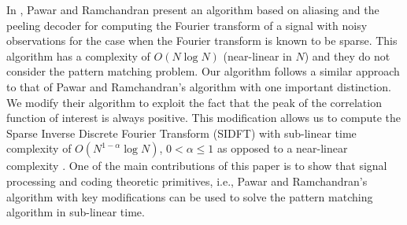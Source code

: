 In \cite{pawar2014robust}, Pawar and Ramchandran present an algorithm based on aliasing and the peeling decoder for computing the Fourier transform of a signal with noisy observations for the case when the Fourier transform is known to be sparse. This algorithm has a complexity of $O(N \log N)$ (near-linear in $N$) and they do not consider the pattern matching problem. Our algorithm follows a similar approach to that of Pawar and Ramchandran's algorithm with one important distinction. We modify their algorithm to exploit the fact that the peak of the correlation function of interest is always positive. This modification allows us to compute the Sparse Inverse Discrete Fourier Transform (SIDFT) with sub-linear time complexity of $O(N^{1-\alpha} \log N)$, $0 < \alpha \leq 1$ as opposed to a near-linear complexity . One of the main contributions of this paper is to show that signal processing and coding theoretic primitives, i.e., Pawar and Ramchandran's algorithm with key modifications can be used to solve the pattern matching algorithm in sub-linear time.
